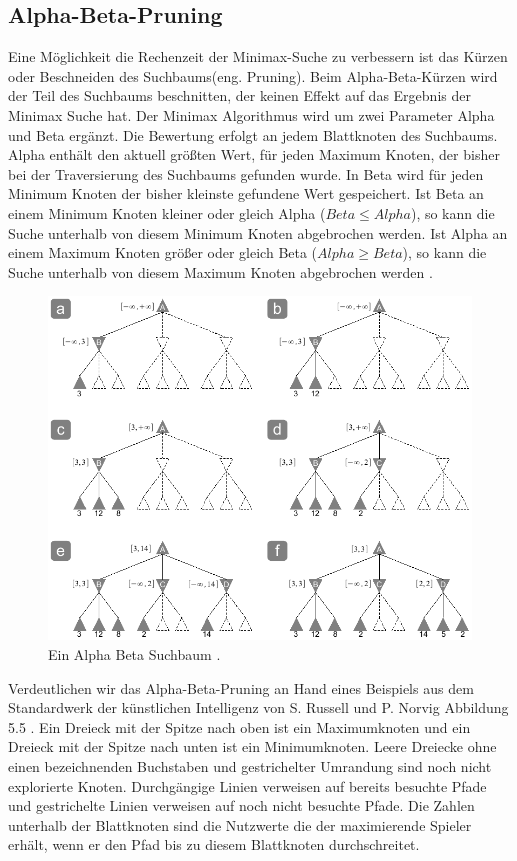 \subsection{Alpha-Beta-Pruning}
Eine Möglichkeit die Rechenzeit der Minimax-Suche zu verbessern ist das Kürzen oder Beschneiden des Suchbaums(eng. Pruning). Beim Alpha-Beta-Kürzen wird der Teil des Suchbaums beschnitten, der keinen Effekt auf das Ergebnis der Minimax Suche hat. Der Minimax Algorithmus wird um zwei Parameter Alpha und Beta ergänzt. Die Bewertung erfolgt an jedem Blattknoten des Suchbaums. Alpha enthält den aktuell größten Wert, für jeden Maximum Knoten, der bisher bei der Traversierung des Suchbaums gefunden wurde. In Beta wird für jeden Minimum Knoten der bisher kleinste gefundene Wert gespeichert. Ist Beta an einem Minimum Knoten kleiner oder gleich Alpha ($Beta \leq Alpha$), so kann die Suche unterhalb von diesem Minimum Knoten abgebrochen werden. Ist Alpha an einem Maximum Knoten größer oder gleich Beta ($Alpha \geq Beta$), so kann die Suche unterhalb von diesem Maximum Knoten abgebrochen werden \cite[116]{Ertel}. \\

\begin{figure}[!htbp]
  \centering
  \includegraphics[scale = 1.2]{inhalt/abbildungen/alpha_beta_suchbaum.pdf}
  \caption{Ein Alpha Beta Suchbaum \cite[213]{Russell}.}
  \label{fig:minimax_tictactoe}
\end{figure} 

Verdeutlichen wir das Alpha-Beta-Pruning an Hand eines Beispiels aus dem Standardwerk der künstlichen Intelligenz von S. Russell und P. Norvig Abbildung 5.5 \cite[213]{Russell}. Ein Dreieck mit der Spitze nach oben ist ein Maximumknoten und ein Dreieck mit der Spitze nach unten ist ein Minimumknoten. Leere Dreiecke ohne einen bezeichnenden Buchstaben und gestrichelter Umrandung sind noch nicht explorierte Knoten. Durchgängige Linien verweisen auf bereits besuchte Pfade und gestrichelte Linien verweisen auf noch nicht besuchte Pfade. Die Zahlen unterhalb der Blattknoten sind die Nutzwerte die der maximierende Spieler erhält, wenn er den Pfad bis zu diesem Blattknoten durchschreitet. \\

